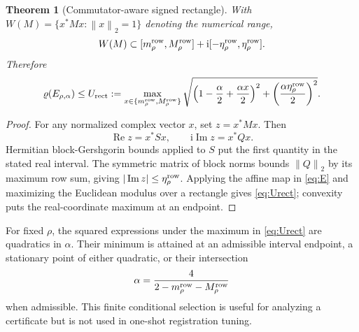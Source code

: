 \documentclass[11pt]{article}
\newtheorem{theorem}{Theorem}[section]
\newcommand{\norm}[1]{\left\lVert #1\right\rVert}
\newcommand{\spr}{\varrho}
\newcommand{\ii}{\mathrm{i}}
\newcommand{\Urect}{U_{\mathrm{rect}}}
\begin{document}
\begin{theorem}[Commutator-aware signed rectangle]\label{thm:rectangle}
With $W(M)=\{x^*Mx:\norm{x}_2=1\}$ denoting the numerical range,
\[
W(M)\subset
[m_\rho^{\rm row},M_\rho^{\rm row}]
+\ii[-\eta_\rho^{\rm row},\eta_\rho^{\rm row}].
\]
Therefore
\begin{equation}
\spr(E_{\rho,\alpha})\le
\Urect:=
\max_{x\in\{m_\rho^{\rm row},M_\rho^{\rm row}\}}
\sqrt{\left(1-\frac{\alpha}{2}+\frac{\alpha x}{2}\right)^2
+\left(\frac{\alpha\eta_\rho^{\rm row}}{2}\right)^2}.
\label{eq:Urect}
\end{equation}
\end{theorem}
\begin{proof}
For any normalized complex vector $x$, set $z=x^*Mx$. Then
\[
\operatorname{Re}z=x^*Sx,\qquad
\ii\operatorname{Im}z=x^*Qx.
\]
Hermitian block-Gershgorin bounds applied to $S$ put the first quantity in the
stated real interval. The symmetric matrix of block norms bounds
$\norm{Q}_2$ by its maximum row sum, giving
$|\operatorname{Im}z|\le\eta_\rho^{\rm row}$. Applying the affine map in
\eqref{eq:E} and maximizing the Euclidean modulus over a rectangle gives
\eqref{eq:Urect}; convexity puts the real-coordinate maximum at an endpoint.
\end{proof}

For fixed $\rho$, the squared expressions under the maximum in
\eqref{eq:Urect} are quadratics in $\alpha$. Their minimum is attained at an
admissible interval endpoint, a stationary point of either quadratic, or their
intersection
\[
\alpha=\frac{4}{2-m_\rho^{\rm row}-M_\rho^{\rm row}}
\]
when admissible. This finite conditional selection is useful for analyzing a
certificate but is not used in one-shot registration tuning.
\end{document}
